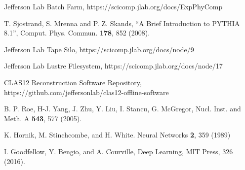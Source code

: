 \documentclass[3p,times,twocolumn]{elsarticle}
\begin{document}
\begin{thebibliography}{99}
Jefferson Lab Batch Farm, https://scicomp.jlab.org/docs/ExpPhyComp

T. Sjostrand, S. Mrenna and P. Z. Skands, ``A Brief Introduction to PYTHIA 8.1'', Comput. Phys. Commun. {\bf 178},
852 (2008).

Jefferson Lab Tape Silo, https://scicomp.jlab.org/docs/node/9

Jefferson Lab Lustre Filesystem, https://scicomp.jlab.org/docs/node/17

CLAS12 Reconstruction Software Repository, https://github.com/jeffersonlab/clas12-offline-software

B. P. Roe, H-J. Yang, J. Zhu, Y. Liu, I. Stancu, G. McGregor, Nucl. Inst. and Meth. A {\bf 543}, 577 (2005).

K. Hornik, M. Stinchcombe, and H. White. Neural Networks {\bf 2}, 359 (1989)

I. Goodfellow, Y. Bengio, and A. Courville,  Deep Learning, MIT Press, 326 (2016).

\end{thebibliography}
\end{document}
